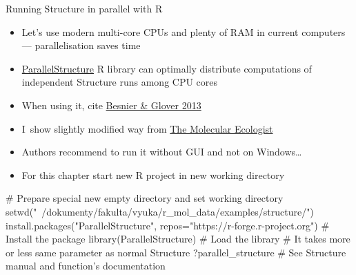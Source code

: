 \documentclass[compress, ucs, xelatex, 11pt, xcolor=svgnames,
  hyperref={
    bookmarks=true,
    unicode=true,
    colorlinks=true,
    pdftitle={Molecular data in R},
    plainpages=false,
    pdfauthor={Vojtech Zeisek},
    pdfsubject={Course about phylogeny and evolution in R},
    pdfcreator={XeLaTeX},
    pdfkeywords={R, evolution, phylogeny, molecular data},
    linkcolor=Tomato,
    anchorcolor=SaddleBrown,
    citecolor=Goldenrod,
    filecolor=DarkMagenta,
    menucolor=Sienna,
    urlcolor=DarkTurquoise,
    pdftex},
  url={hyphens, lowtilde} %
  ]{beamer}
\begin{document}
\begin{frame}[fragile]{Running Structure in parallel with R}
  \begin{itemize}
    \item Let's use modern multi-core CPUs and plenty of RAM in current computers --- parallelisation saves time
    \item \href{https://r-forge.r-project.org/R/?group_id=1636}{ParallelStructure} R library can optimally distribute computations of independent Structure runs among CPU cores
    \item When using it, cite \href{http://www.plosone.org/article/info\%3Adoi\%2F10.1371\%2Fjournal.pone.0070651}{Besnier \& Glover 2013}
    \item I~show slightly modified way from \href{https://www.molecularecologist.com/2013/09/using-r-to-run-parallel-analyses-of-population-genetic-data-in-structure-parallelstructure/}{The Molecular Ecologist}
    \item Authors recommend to run it without GUI and not on Windows\ldots
    \item For this chapter start new R project in new working directory
  \end{itemize}
  \begin{spluscode}
    # Prepare special new empty directory and set working directory
    setwd("~/dokumenty/fakulta/vyuka/r_mol_data/examples/structure/")
    install.packages("ParallelStructure",
      repos="https://r-forge.r-project.org") # Install the package
    library(ParallelStructure) # Load the library
    # It takes more or less same parameter as normal Structure
    ?parallel_structure # See Structure manual and function's documentation
  \end{spluscode}
\end{frame}
\end{document}
